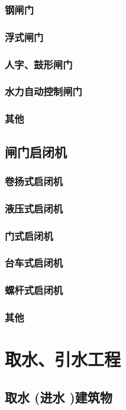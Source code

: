 \documentclass[UTF8]{../../ApplicationUniverse}
\begin{document}
        \subsubsection{钢闸门}
        \subsubsection{浮式闸门}
        \subsubsection{人字、鼓形闸门}
        \subsubsection{水力自动控制闸门}
        \subsubsection{其他}
    \subsection{闸门启闭机}
        \subsubsection{卷扬式启闭机}
        \subsubsection{液压式启闭机}
        \subsubsection{门式启闭机}
        \subsubsection{台车式启闭机}
        \subsubsection{螺杆式启闭机}
        \subsubsection{其他}
\section{取水、引水工程}
    \subsection{取水 (进水 )建筑物}
\end{document}
